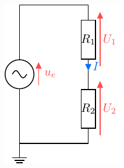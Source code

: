 \documentclass[../main/main.tex]{subfiles}
\begin{document}
\begin{minipage}[t]{.35\linewidth}
	~
	\vspace{-10pt}
	\begin{center}
		\includegraphics[width=\linewidth]{divis_tension}
	\end{center}
\end{minipage}
\end{document}
